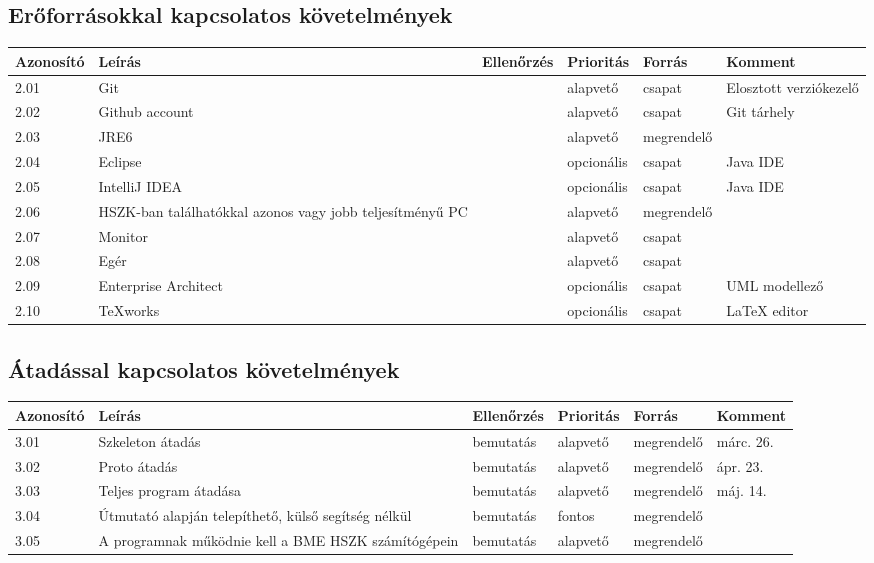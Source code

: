 \subsection{Erőforrásokkal kapcsolatos követelmények}


\begin{longtable}{| l | p{5cm} | l | l | l | l |}
\hline
\textbf{Azonosító}   & \textbf{Leírás} & \textbf{Ellenőrzés} & \textbf{Prioritás} & \textbf{Forrás} & \textbf{Komment} \tabularnewline
\hline\hline
2.01 & Git &  & alapvető & csapat & Elosztott verziókezelő \tabularnewline
\hline
2.02 & Github account &  & alapvető & csapat & Git tárhely \tabularnewline
\hline
2.03 & JRE6 &  & alapvető & megrendelő & \tabularnewline
\hline
2.04 & Eclipse &  & opcionális & csapat & Java IDE \tabularnewline
\hline
2.05 & IntelliJ IDEA &  & opcionális & csapat & Java IDE \tabularnewline
\hline
2.06 & HSZK-ban találhatókkal azonos vagy jobb teljesítményű PC &  & alapvető & megrendelő &  \tabularnewline
\hline
2.07 & Monitor &  & alapvető & csapat &  \tabularnewline
\hline
2.08 & Egér &  & alapvető & csapat &  \tabularnewline
\hline
2.09 & Enterprise Architect &  & opcionális & csapat & UML modellező \tabularnewline
\hline
2.10 & TeXworks &  & opcionális & csapat & LaTeX editor \tabularnewline
\hline
\end{longtable}


\subsection{Átadással kapcsolatos követelmények}

\begin{longtable}{| l | p{5cm} | l | l | l | l |}
\hline
\textbf{Azonosító}   & \textbf{Leírás} & \textbf{Ellenőrzés} & \textbf{Prioritás} & \textbf{Forrás} & \textbf{Komment} \tabularnewline
\hline\hline
3.01 & Szkeleton átadás & bemutatás & alapvető & megrendelő & márc. 26. \tabularnewline
\hline
3.02 & Proto átadás & bemutatás & alapvető & megrendelő & ápr. 23. \tabularnewline
\hline
3.03 & Teljes program átadása & bemutatás & alapvető & megrendelő & máj. 14. \tabularnewline
\hline
3.04 & Útmutató alapján telepíthető, külső segítség nélkül & bemutatás & fontos & megrendelő &  \tabularnewline
\hline
3.05 & A programnak működnie kell a BME HSZK számítógépein & bemutatás & alapvető & megrendelő &  \tabularnewline
\hline
\end{longtable}

